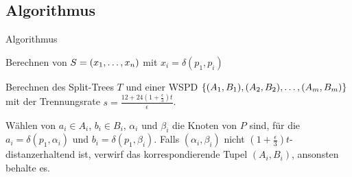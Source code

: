 \documentclass{beamer}
\begin{document}
	
	\subsection{Algorithmus}
	\begin{frame}{Algorithmus}
		\begin{description}
			\item<1->[Schritt 1:] Berechnen von $S = (x_1, \mathellipsis, x_n)$ mit $x_i = \delta(p_1, p_i)$
			\item<2->[Schritt 2:] Berechnen des Split-Trees $T$ und einer WSPD $\{(A_1, B_1), (A_2, B_2), \mathellipsis, (A_m, B_m)\}$ mit der Trennungsrate $s = \frac{12 + 24(1 + \frac{\epsilon}{3})t}{\epsilon}$. 
			\item<3->[Schritt 3:] Wählen von $a_i \in A_i$, $b_i \in B_i$, $\alpha_i$ und  $\beta_i$ die Knoten von $P$ sind, für die $a_i = \delta(p_1, \alpha_i)$ und $b_i = \delta(p_1, \beta_i)$. 
			Falls $(\alpha_i, \beta_i)$ nicht $(1+\frac{\epsilon}{3})t$-distanzerhaltend ist, verwirf das korrespondierende Tupel $(A_i, B_i)$, ansonsten behalte es.
		\end{description}
	\end{frame} 
	
\end{document}

